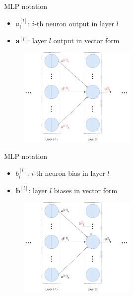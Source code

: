 \documentclass[compress,oilve,t]{beamer}
\begin{document}
\begin{frame}{MLP notation}
	\begin{itemize}
		\item $a^{[l]}_i$: $i$-th neuron output in layer $l$
		\item $\bm{a}^{[l]}$: layer $l$ output in vector form
	\end{itemize}
	\begin{figure}[H]
		\centering
		\includegraphics[width=0.5\textwidth]{Figs/notation1.png}
	\end{figure}
\end{frame}

\begin{frame}{MLP notation}
	\begin{itemize}
		\item $b^{[l]}_i$: $i$-th neuron bias in layer $l$
		\item $\bm{b}^{[l]}$: layer $l$ biases in vector form
	\end{itemize}
	\begin{figure}[H]
		\centering
		\includegraphics[width=0.5\textwidth]{Figs/notation1.2.png}
	\end{figure}
\end{frame}
\end{document}
